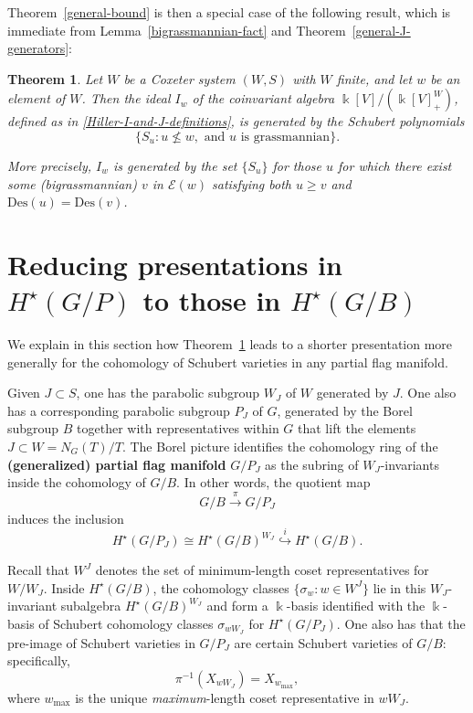\documentclass[12pt,dvips]{amsart}
\theoremstyle{plain}
\newtheorem{theorem}{Theorem}[section]
\theoremstyle{definition}
\theoremstyle{remark}
\numberwithin{equation}{section}
\def\Ess{{\mathcal{E}}}
\def\Des{\mathrm{Des}}
\begin{document}
Theorem~\ref{general-bound} is then a special case of the following result, which 
is immediate from Lemma~\ref{bigrassmannian-fact} and Theorem~\ref{general-J-generators}:

\begin{theorem}
\label{Hiller-BGG-general-bound}
Let $W$ be a Coxeter system $(W,S)$ with $W$ finite, and let $w$ be an element
of $W$.  Then the ideal $I_w$ 
of the coinvariant algebra $\Bbbk[V]/(\Bbbk[V]^W_+)$, defined as in 
\eqref{Hiller-I-and-J-definitions}, is
generated by the Schubert polynomials 
$$
\{S_u: u \not\leq w, \text{ and }u\text{ is grassmannian}\}.
$$

More precisely, $I_w$ is generated by the set
$\{S_u \}$ for those $u$ for which there exist some (bigrassmannian)
$v$ in $\Ess(w)$ satisfying both $u \geq v$ and $\Des(u) = \Des(v)$.
\end{theorem}

\section{Reducing presentations in $H^{\star}(G/P)$ to those in $H^{\star}(G/B)$}
\label{parabolic-section}

  We explain in this section how Theorem~\ref{Hiller-BGG-general-bound}
leads to a shorter presentation more generally for the cohomology of Schubert
varieties in any partial flag manifold.

 Given $J \subset S$, one has the parabolic subgroup $W_J$ of $W$
generated by $J$.  One also has a corresponding parabolic subgroup $P_J$ of $G$,
generated by the Borel subgroup $B$ together with representatives within $G$
that lift the elements $J \subset W=N_G(T)/T$.
The Borel picture identifies the cohomology ring
of the {\bf (generalized) partial flag manifold}  $G/P_J$ as the subring of
$W_J$-invariants inside the cohomology of $G/B$.  In other words, 
the quotient map 
\[G/B \overset{\pi}{\rightarrow} G/P_J\] 
induces the inclusion
\begin{equation}
\label{parabolic-inclusion}
H^\star(G/P_J) \cong H^\star(G/B)^{W_J} \overset{i}{\hookrightarrow} H^\star(G/B).
\end{equation}

Recall that $W^J$ denotes the set of minimum-length coset
representatives for $W/W_J$.  Inside $H^\star(G/B)$, the cohomology
classes $\{ \sigma_w: w \in W^J\}$ lie in this $W_J$-invariant
subalgebra $H^\star(G/B)^{W_J}$ and form a $\Bbbk$-basis identified
with the $\Bbbk$-basis of Schubert cohomology classes $\sigma_{wW_J}$
for $H^\star(G/P_J)$.  One also has that the pre-image of Schubert
varieties in $G/P_J$ are certain Schubert varieties of $G/B$:
specifically,
$$
\pi^{-1}(X_{wW_J}) = X_{w_{\max}},
$$
where $w_{\max}$ is the unique {\it maximum}-length coset representative in $wW_J$.
\end{document}
